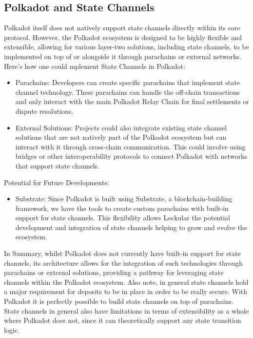 \documentclass{tufte-handout}
\begin{document}
\subsection{Polkadot and State Channels}\label{sec:headings}
Polkadot itself does not natively support state channels directly within its core protocol. However, the Polkadot ecosystem is designed to be highly flexible and extensible, allowing
for various layer-two solutions, including state channels, to be implemented on top of or alongside it through parachains or external networks.
Here's how one could mplement State Channels in Polkadot:
\begin{itemize}
\item Parachains: Developers can create specific parachains that implement state channel technology. These parachains can handle the off-chain transactions and only interact with the
main Polkadot Relay Chain for final settlements or dispute resolutions.
\item External Solutions: Projects could also integrate existing state channel solutions that are not natively part of the Polkadot ecosystem but can interact with it through
cross-chain communication. This could involve using bridges or other interoperability protocols to connect Polkadot with networks that support state channels.
\end{itemize}
Potential for Future Developments:
\begin{itemize}
\item Substrate: Since Polkadot is built using Substrate, a blockchain-building framework, we have the tools to create custom parachains with built-in support for state
channels. This flexibility allows Lockular the potential development and integration of state channels helping to grow and evolve the ecosystem.
\end{itemize}
In Summary, whilst Polkadot does not currently have built-in support for state channels, its architecture allows for the integration of such technologies through parachains or
external solutions, providing a pathway for leveraging state channels within the Polkadot ecosystem. Also note, in general state channels hold a major requirement for deposits
to be in place in order to be really secure. With Polkadot it is perfectly possible to build state channels on top of parachains. State channels in general also have limitations
in terms of extensibility as a whole where Polkadot does not, since it can theoretically support any state transition logic.
\end{document}
